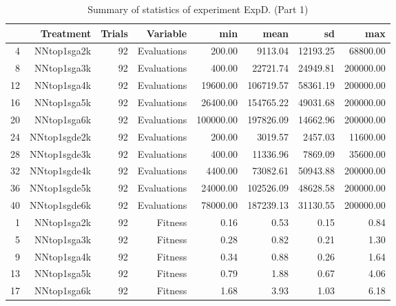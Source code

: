\begin{table}[ht]
\centering
\begin{tabular}{rrrrrrrr}
  \hline
 & Treatment & Trials & Variable & min & mean & sd & max \\ 
  \hline
4 & NNtop1sga2k &  92 & Evaluations & 200.00 & 9113.04 & 12193.25 & 68800.00 \\ 
  8 & NNtop1sga3k &  92 & Evaluations & 400.00 & 22721.74 & 24949.81 & 200000.00 \\ 
  12 & NNtop1sga4k &  92 & Evaluations & 19600.00 & 106719.57 & 58361.19 & 200000.00 \\ 
  16 & NNtop1sga5k &  92 & Evaluations & 26400.00 & 154765.22 & 49031.68 & 200000.00 \\ 
  20 & NNtop1sga6k &  92 & Evaluations & 100000.00 & 197826.09 & 14662.96 & 200000.00 \\ 
  24 & NNtop1sgde2k &  92 & Evaluations & 200.00 & 3019.57 & 2457.03 & 11600.00 \\ 
  28 & NNtop1sgde3k &  92 & Evaluations & 400.00 & 11336.96 & 7869.09 & 35600.00 \\ 
  32 & NNtop1sgde4k &  92 & Evaluations & 4400.00 & 73082.61 & 50943.88 & 200000.00 \\ 
  36 & NNtop1sgde5k &  92 & Evaluations & 24000.00 & 102526.09 & 48628.58 & 200000.00 \\ 
  40 & NNtop1sgde6k &  92 & Evaluations & 78000.00 & 187239.13 & 31130.55 & 200000.00 \\ 
  1 & NNtop1sga2k &  92 & Fitness & 0.16 & 0.53 & 0.15 & 0.84 \\ 
  5 & NNtop1sga3k &  92 & Fitness & 0.28 & 0.82 & 0.21 & 1.30 \\ 
  9 & NNtop1sga4k &  92 & Fitness & 0.34 & 0.88 & 0.26 & 1.64 \\ 
  13 & NNtop1sga5k &  92 & Fitness & 0.79 & 1.88 & 0.67 & 4.06 \\ 
  17 & NNtop1sga6k &  92 & Fitness & 1.68 & 3.93 & 1.03 & 6.18 \\ 
   \hline
\end{tabular}
\caption{Summary of statistics of experiment ExpD. (Part 1)} 
\end{table}
